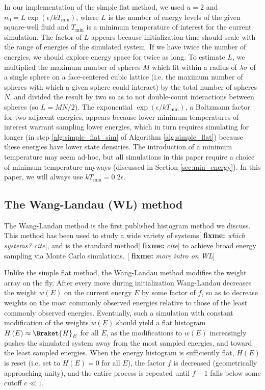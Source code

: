 \documentclass[11pt]{article}
\newcommand{\bk}{\Braket} %
\renewcommand{\t}{\text} %
\newcommand{\p}[1]{\left(#1\right)} %
\newcommand{\red}[1]{{\bf \color{red} #1}}
\newcommand{\fixme}[1]{[\red{fixme:} \emph{#1}]}
\begin{document}
In our implementation of the simple flat method, we used $u=2$ and
$n_0=L\exp\p{\epsilon/kT_{\t{min}}}$, where $L$ is the number of
energy levels of the given square-well fluid and $T_{\t{min}}$ is a
minimum temperature of interest for the current simulation. The factor
of $L$ appears because initialization time should scale with the range
of energies of the simulated system. If we have twice the number of
energies, we should explore energy space for twice as long. To
estimate $L$, we multiplied the maximum number of spheres $M$ which
fit within a radius of $\lambda\sigma$ of a single sphere on a
face-centered cubic lattice (i.e. the maximum number of spheres with
which a given sphere could interact) by the total number of spheres
$N$, and divided the result by two so as to not double-count
interactions between spheres (so $L=MN/2$). The exponential
$\exp\p{\epsilon/kT_{\t{min}}}$, a Boltzmann factor for two adjacent
energies, appears because lower minimum temperatures of interest
warrant sampling lower energies, which in turn requires simulating for
longer (in step \ref{alg:simple_flat_sim} of Algorithm
\ref{alg:simple_flat}) because these energies have lower state
densities. The introduction of a minimum temperature may seem ad-hoc,
but all simulations in this paper require a choice of minimum
temperature anyways (discussed in Section \ref{sec:min_energy}). In
this paper, we will always use $kT_{\t{min}}=0.2\epsilon$.

\subsection{The Wang-Landau (WL) method}
\label{sec:wang_landau}

The Wang-Landau method is the first published histogram method we
discuss\cite{wang_landau, wang_landau_mod, wang_landau_analysis}. This
method has been used to study a wide variety of systems\fixme{which
  systems? cite}, and is the standard method\fixme{cite} to achieve
broad energy sampling via Monte Carlo simulations. \fixme{more intro
  on WL}

Unlike the simple flat method, the Wang-Landau method modifies the
weight array on the fly. After every move during initialization
Wang-Landau decreases the weight $w\p{E}$ on the current energy $E$ by
some factor of $f$, so as to decrease weights on the most commonly
observed energies relative to those of the least commonly observed
energies. Eventually, such a simulation with constant modification of
the weights $w\p{E}$ should yield a flat histogram
$H\p{E}\approx\bk{H}_E$ for all $E$, as the modifications to $w\p{E}$
increasingly pushes the simulated system away from the most sampled
energies, and toward the least sampled energies. When the energy
histogram is sufficiently flat, $H\p{E}$ is reset (i.e. set to
$H\p{E}=0$ for all $E$), the factor $f$ is decreased (geometrically
approaching unity), and the entire process is repeated until $f-1$
falls below some cutoff $c\ll 1$.
\end{document}
